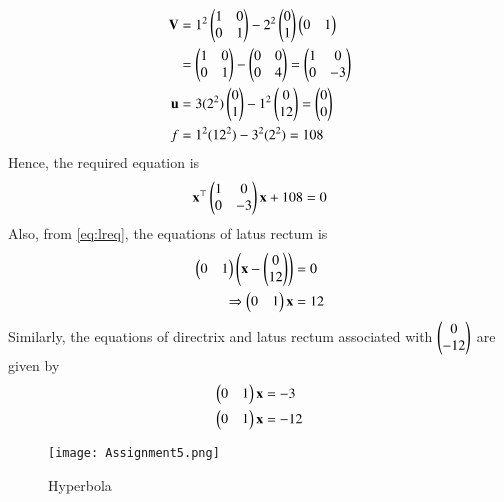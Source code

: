 \documentclass[journal,12pt,twocolumn]{IEEEtran}
\begin{document}
\begin{align}
    \mathbf{V}&=1^2\begin{pmatrix}1&0\\0&1\end{pmatrix} - 2^2\begin{pmatrix}0\\1\end{pmatrix}\begin{pmatrix}0&1\end{pmatrix}\\
    &=\begin{pmatrix}1&0\\0&1\end{pmatrix}-\begin{pmatrix}0&0\\0&4\end{pmatrix}=\begin{pmatrix}1&0\\0&-3\end{pmatrix}\\
    \mathbf{u}&= 3(2^2)\begin{pmatrix}0\\1\end{pmatrix} - 1^2\begin{pmatrix}0\\12\end{pmatrix}=\begin{pmatrix}0\\0\end{pmatrix}\\
    f &= 1^2(12^2) - 3^2(2^2)= 108
\end{align}
Hence, the required equation is
\begin{align}
    \mathbf{x}^{\top}\begin{pmatrix}1&0\\0&-3\end{pmatrix}\mathbf{x}+108=0
\end{align}
Also, from \eqref{eq:lreq}, the equations of latus rectum is
\begin{align}
    \begin{pmatrix}0&1\end{pmatrix}\left(\mathbf{x}-\begin{pmatrix}0\\12\end{pmatrix}\right) &= 0\\
    \Rightarrow \begin{pmatrix}0&1\end{pmatrix}\mathbf{x} &= 12
\end{align}
Similarly, the equations of directrix and latus rectum associated with $\begin{pmatrix}0\\ -12\end{pmatrix}$ are given by
\begin{align}
    \begin{pmatrix}0&1\end{pmatrix}\mathbf{x} &= -3\\
    \begin{pmatrix}0&1\end{pmatrix}\mathbf{x} &= -12
\end{align}
\begin{figure}[!h]
 \centering
 \texttt{[image: Assignment5.png]}
 \caption{Hyperbola}
 \label{plot}
\end{figure}
\end{document}
